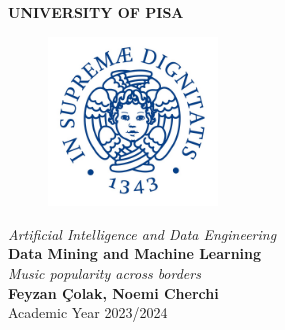\begin{titlepage}
    \centering
    \vspace*{\fill}
    {\LARGE \textbf{UNIVERSITY OF PISA}}\\[0.5cm]
    \begin{figure}[h]
        \centering
        \includegraphics[width=0.4\textwidth]{media/university-of-Pisa-logo.jpg}
    \end{figure}
    {\Large \textit{Artificial Intelligence and Data Engineering}}\\[1.5cm]
    {\LARGE \textbf{Data Mining and Machine Learning}}\\[1cm]
    {\Large \textit{Music popularity across borders}}\\[2cm]
    
    {\large \textbf{Feyzan Çolak, Noemi Cherchi}}\\[0.5cm]
    {\large Academic Year 2023/2024}
    \vspace*{\fill}
\end{titlepage}